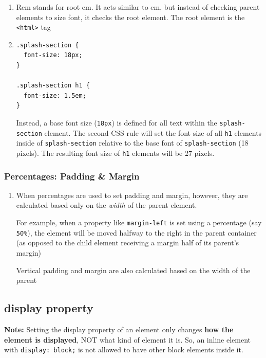 \documentclass[a4paper, 12pt]{article}
\begin{document}
\begin{enumerate}
\item Rem stands for root em. It acts similar to em, but instead of checking parent elements to size font, it checks the root element. The root element is the \verb|<html>| tag

\item \begin{verbatim}
.splash-section {
  font-size: 18px;
}

.splash-section h1 {
  font-size: 1.5em;
}
\end{verbatim}
Instead, a base font size (\verb|18px|) is defined for all text within the \verb|splash-section| element. The second CSS rule will set the font size of all \verb|h1| elements inside of \verb|splash-section| relative to the base font of \verb|splash-section| (18 pixels). The resulting font size of \verb|h1| elements will be 27 pixels.
\end{enumerate}

\subsubsection{Percentages: Padding \& Margin}
\begin{enumerate}
\item When percentages are used to set padding and margin, however, they are calculated based only on the \textit{width} of the parent element.

For example, when a property like \verb|margin-left| is set using a percentage (say \verb|50%|), the element will be moved halfway to the right in the parent container (as opposed to the child element receiving a margin half of its parent's margin)

Vertical padding and margin are also calculated based on the width of the parent

\end{enumerate}

\subsection{display property}
\textbf{Note:} Setting the display property of an element only changes \textbf{how the element is displayed}, NOT what kind of element it is. So, an inline element with \verb|display: block;| is not allowed to have other block elements inside it.
\end{document}
